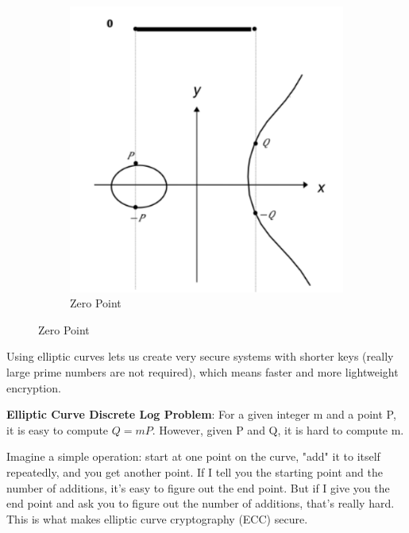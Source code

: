 \begin{figure}[h!]
\begin{subfigure}[b]{0.3\textwidth}
        \includegraphics[width=\linewidth]{img/zeropoint.png}
        \caption{Zero Point}
    \end{subfigure}
\end{figure}

Using elliptic curves lets us create very secure systems with shorter keys (really large prime numbers are not required), which means faster and more lightweight encryption.

\begin{defn}
    \textbf{Elliptic Curve Discrete Log Problem}: For a given integer m and a point P, it is easy to compute $Q = mP$. However, given P and Q, it is hard to compute m.
\end{defn}

Imagine a simple operation: start at one point on the curve, "add" it to itself repeatedly, and you get another point. If I tell you the starting point and the number of additions, it's easy to figure out the end point. But if I give you the end point and ask you to figure out the number of additions, that's really hard. This is what makes elliptic curve cryptography (ECC) secure.
